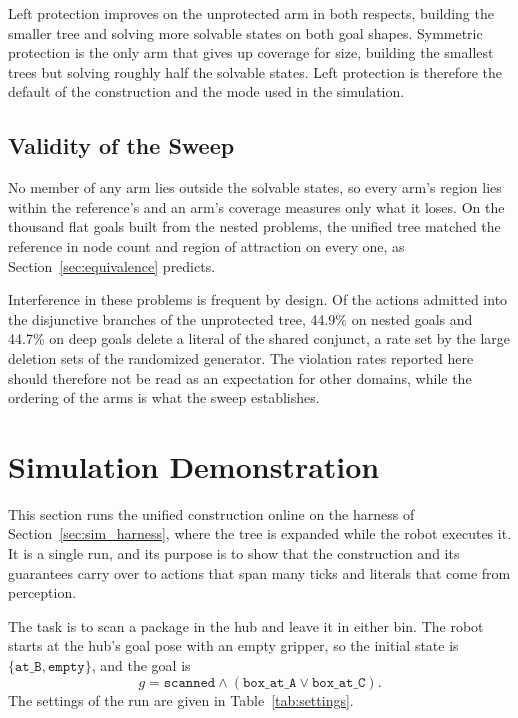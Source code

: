     Left protection improves on the unprotected arm in both respects, building the smaller tree and solving more solvable states on both goal shapes.
    Symmetric protection is the only arm that gives up coverage for size, building the smallest trees but solving roughly half the solvable states.
    Left protection is therefore the default of the construction and the mode used in the simulation.

    \subsection{Validity of the Sweep}
    \label{subsec:interference_validity}
    No member of any arm lies outside the solvable states, so every arm's region lies within the reference's and an arm's coverage measures only what it loses.
    On the thousand flat goals built from the nested problems, the unified tree matched the reference in node count and region of attraction on every one, as Section~\ref{sec:equivalence} predicts.

    Interference in these problems is frequent by design.
    Of the actions admitted into the disjunctive branches of the unprotected tree, 44.9\% on nested goals and 44.7\% on deep goals delete a literal of the shared conjunct, a rate set by the large deletion sets of the randomized generator.
    The violation rates reported here should therefore not be read as an expectation for other domains, while the ordering of the arms is what the sweep establishes.
    
\section{Simulation Demonstration}
\label{sec:results_sim}
    This section runs the unified construction online on the harness of Section~\ref{sec:sim_harness}, where the tree is expanded while the robot executes it.
    It is a single run, and its purpose is to show that the construction and its guarantees carry over to actions that span many ticks and literals that come from perception.

    The task is to scan a package in the hub and leave it in either bin.
    The robot starts at the hub's goal pose with an empty gripper, so the initial state is $\{\texttt{at\_B}, \texttt{empty}\}$, and the goal is
    \begin{equation}
        g = \texttt{scanned} \wedge (\texttt{box\_at\_A} \vee \texttt{box\_at\_C}).
        \label{eq:sim_goal}
    \end{equation}
    The settings of the run are given in Table~\ref{tab:settings}.

